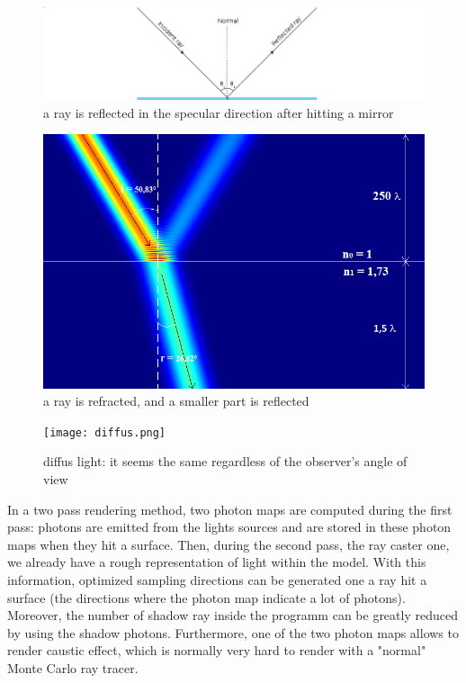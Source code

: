\documentclass[12pt]{article}
\numberwithin{equation}{section}
\begin{document}
\begin{figure}
  \begin{center}
    \includegraphics[scale=0.6]{425px-ray_optics_diagram_incidence_reflection_and_refraction_svg_wide.png}
    \caption{a ray is reflected in the specular direction after hitting a mirror}
    \label{fig:1}
  \end{center}
\end{figure}

\begin{figure}
  \begin{center}
    \includegraphics[scale=0.3]{RefractionModelisation.png}
    \caption{a ray is refracted, and a smaller part is reflected}
    \label{fig:2}
  \end{center}
\end{figure}

\begin{figure}
  \begin{center}
    \texttt{[image: diffus.png]}
    \caption{diffus light: it seems the same regardless of the observer's angle of view }
    \label{fig:3}
  \end{center}
\end{figure}

In a two pass rendering method, two photon maps are computed during the first pass: photons are emitted from the lights sources and are stored in these photon maps when they hit a surface. Then, during the second pass, the ray caster one, we already have a rough representation of light within the model. With this information, optimized sampling directions can be generated one a ray hit a surface (the directions where the photon map indicate a lot of photons). Moreover, the number of shadow ray inside the programm can be greatly reduced by using the shadow photons. Furthermore, one of the two photon maps allows to render caustic effect, which is normally very hard to render with a "normal" Monte Carlo ray tracer.\\
\end{document}
